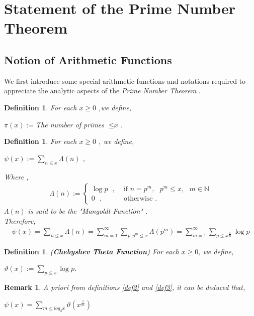 \documentclass[article,12pt]{elsarticle}
\newtheorem{dfn}[thm]{Definition}
\newtheorem{rmk}[thm]{Remark}
\begin{document}
	\section{Statement of the Prime Number Theorem}
	\subsection{Notion of Arithmetic Functions}
	We first introduce some special arithmetic functions and notations required to appreciate the analytic aspects of the \textit{Prime Number Theorem} \cite{6}.
	\begin{dfn}\label{def1}
		For each $\textit{x}\geq0$ ,we define,
		\begin{center}
			$ \pi(x):=$The number of primes $\leq \textit{x}$.
		\end{center}
	\end{dfn}
	\begin{dfn}\label{def2}
		For each $\textit{x}\geq0$ , we define,
		\begin{center}
			$\psi(x):=\sum\limits_{n\le x}\Lambda(n)$ ,
		\end{center}
		Where ,  
		\begin{eqnarray}\label{1}
			\Lambda(n) 
			:=\left\{
			\begin{array}{cc}
				\log p\mbox{ }, &\mbox{ if }n=p^m,\mbox{ } p^m\leq x,\mbox{ }m\in \mathbb{N}\\
				0\mbox{ }, &\mbox{ otherwise }.
			\end{array}
			\right.
		\end{eqnarray} 
		$ \Lambda(n)$ is said to be the "\textit{Mangoldt Function}"  .\\
		Therefore,
		\begin{eqnarray}\label{2}
			\psi(x) = \sum\limits_{n\leq x}\Lambda(n) = \sum\limits_{m=1}^{\infty}\sum\limits_{p ,  p^m\leq x} \Lambda(p^m) = \sum\limits_{m=1}^{\infty}\sum\limits_{p\leq x^{\frac{1}{m}}} \log p
		\end{eqnarray}
	\end{dfn} 
	\begin{dfn}\label{def3}
		(\textbf{Chebyshev Theta Function}) For each $x\geq0$, we define,
		\begin{center}
			$ \vartheta(x) := \sum\limits_{p\leq x} \log p $.
		\end{center}  
	\end{dfn} 
	\begin{rmk}\label{rmk1}
		A priori from definitions \eqref{def2} and \eqref{def3}, it can be deduced that,
		\begin{center}
			$ \psi(x) = \sum\limits_{m\leq log_{2}{x}} \vartheta(x^{\frac{1}{m}}) $
		\end{center} 
	\end{rmk}
	
\end{document}
